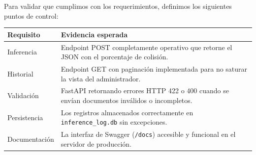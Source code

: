 Para validar que cumplimos con los requerimientos, definimos los siguientes puntos de control:

\begin{tabular}{@{}p{5.5cm}p{7.8cm}@{}}
  \toprule
  Requisito & Evidencia esperada \\
  \midrule
  Inferencia & Endpoint POST completamente operativo que retorne el JSON con el porcentaje de colisión. \\
  Historial & Endpoint GET con paginación implementada para no saturar la vista del administrador. \\
  Validación & FastAPI retornando errores HTTP 422 o 400 cuando se envían documentos inválidos o incompletos. \\
  Persistencia & Los registros almacenados correctamente en \texttt{inference\_log.db} sin excepciones. \\
  Documentación & La interfaz de Swagger (\texttt{/docs}) accesible y funcional en el servidor de producción. \\
  \bottomrule
\end{tabular}
